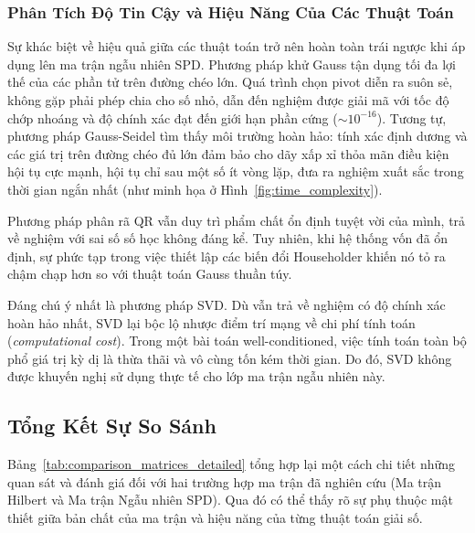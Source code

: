 \subsubsection{Phân Tích Độ Tin Cậy và Hiệu Năng Của Các Thuật Toán}

Sự khác biệt về hiệu quả giữa các thuật toán trở nên hoàn toàn trái ngược khi áp dụng lên ma trận ngẫu nhiên SPD. Phương pháp khử Gauss tận dụng tối đa lợi thế của các phần tử trên đường chéo lớn. Quá trình chọn pivot diễn ra suôn sẻ, không gặp phải phép chia cho số nhỏ, dẫn đến nghiệm được giải mã với tốc độ chớp nhoáng và độ chính xác đạt đến giới hạn phần cứng ($\sim 10^{-16}$). Tương tự, phương pháp Gauss-Seidel tìm thấy môi trường hoàn hảo: tính xác định dương và các giá trị trên đường chéo đủ lớn đảm bảo cho dãy xấp xỉ thỏa mãn điều kiện hội tụ cực mạnh, hội tụ chỉ sau một số ít vòng lặp, đưa ra nghiệm xuất sắc trong thời gian ngắn nhất (như minh họa ở Hình~\ref{fig:time_complexity}).

Phương pháp phân rã QR vẫn duy trì phẩm chất ổn định tuyệt vời của mình, trả về nghiệm với sai số số học không đáng kể. Tuy nhiên, khi hệ thống vốn đã ổn định, sự phức tạp trong việc thiết lập các biến đổi Householder khiến nó tỏ ra chậm chạp hơn so với thuật toán Gauss thuần túy.

Đáng chú ý nhất là phương pháp SVD. Dù vẫn trả về nghiệm có độ chính xác hoàn hảo nhất, SVD lại bộc lộ nhược điểm trí mạng về chi phí tính toán (\textit{computational cost}). Trong một bài toán well-conditioned, việc tính toán toàn bộ phổ giá trị kỳ dị là thừa thãi và vô cùng tốn kém thời gian. Do đó, SVD không được khuyến nghị sử dụng thực tế cho lớp ma trận ngẫu nhiên này.

\subsection{Tổng Kết Sự So Sánh}

Bảng~\ref{tab:comparison_matrices_detailed} tổng hợp lại một cách chi tiết những quan sát và đánh giá đối với hai trường hợp ma trận đã nghiên cứu (Ma trận Hilbert và Ma trận Ngẫu nhiên SPD). Qua đó có thể thấy rõ sự phụ thuộc mật thiết giữa bản chất của ma trận và hiệu năng của từng thuật toán giải số.

